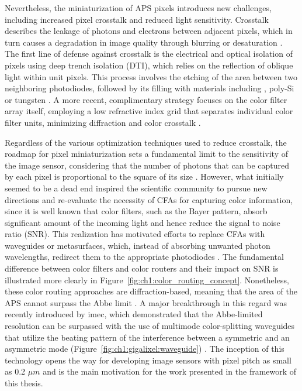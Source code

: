 Nevertheless, the miniaturization of APS pixels introduces new challenges, including increased pixel crosstalk and reduced light sensitivity. Crosstalk describes the leakage of photons and electrons between adjacent pixels, which in turn causes a degradation in image quality through blurring or desaturation \cite{Kim2022CrosstalkDeconvolution}. The first line of defense against crosstalk is the electrical and optical isolation of pixels using deep trench isolation (DTI), which relies on the reflection of oblique light within unit pixels. This process involves the etching of the area between two neighboring photodiodes, followed by its filling with materials including , poly-Si or tungsten \cite{Ahn2014AGate, Okawa2019ALevel, Kim2020ATechnology, Park20217.9Isolation}. A more recent, complimentary strategy focuses on the color filter array itself, employing a low refractive index grid that separates individual color filter units, minimizing diffraction and color crosstalk \cite{Han_Lin1.1umImprovement}.


Regardless of the various optimization techniques used to reduce crosstalk, the roadmap for pixel miniaturization sets a fundamental limit to the sensitivity of the image sensor, considering that the number of photons that can be captured by each pixel is proportional to the square of its size \cite{Kim2024FreeformSensors}. However, what initially seemed to be a dead end inspired the scientific community to pursue new directions and re-evaluate the necessity of CFAs for capturing color information, since it is well known that color filters, such as the Bayer pattern, absorb significant amount of the incoming light and hence reduce the signal to noise ratio (SNR). This realization has motivated efforts to replace CFAs with waveguides or metasurfaces, which, instead of absorbing unwanted photon wavelengths, redirect them to the appropriate photodiodes \cite{Nishiwaki2013EfficientSensors, Miyata2019High-SensitivityMetasurfaces, Kim2024FreeformSensors, Zou2022Pixel-levelMetasurfaces, Catrysse2022SubwavelengthEfficiency}. The fundamental difference between color filters and color routers and their impact on SNR is illustrated more clearly in Figure~\ref{fig:ch1:color_routing_concept}. Nonetheless, these color routing approaches are diffraction-based, meaning that the area of the APS cannot surpass the Abbe limit \cite{Shramkova2024HighSeparation}. A major breakthrough in this regard was recently introduced by imec, which demonstrated that the Abbe-limited resolution can be surpassed with the use of multimode color-splitting waveguides that utilize the beating pattern of the interference between a symmetric and an asymmetric mode (Figure~\ref{fig:ch1:gigalixel:waveguide}) \cite{Kang2023Wafer-level-integratedSplitters}. The inception of this technology opens the way for developing image sensors with pixel pitch as small as 0.2 $\mu m$ and is the main motivation for the work presented in the framework of this thesis. 

